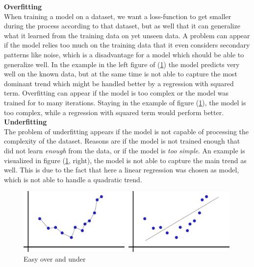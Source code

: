 
\textbf{Overfitting}\\
When training a model on a dataset, we want a loss-function to get smaller during the process according to that dataset, but as well that it can generalize what it learned from the training data on yet unseen data. A problem can appear if the model relies too much on the training data that it even considers secondary patterns like noise, which is a disadvantage for a model which should be able to generalize well. In the example in the left figure of (\ref{fig:underover}) the model predicts very well on the known data, but at the same time is not able to capture the most dominant trend which might be handled better by a regression with squared term. Overfitting can appear if the model is too complex or the model was trained for to many iterations. Staying in the example of figure (\ref{fig:underover}), the model is too complex, while a regression with squared term would perform better. \\

\textbf{Underfitting}\\
The problem of underfitting appears if the model is not capable of processing the complexity of the dataset. Reasons are if the model is not trained enough that did not learn \textit{enough} from the data, or if the model is \textit{too simple}.
An example is visualized in figure (\ref{fig:underover}, right), the model is not able to capture the main trend as well. This is due to the fact that here a linear regression was chosen as model, which is not able to handle a quadratic trend.


\begin{figure}[ht]
    \center
    \includegraphics[width=0.99\textwidth]{figures/underoverfitting.png}
	\caption{Easy over and under}
	\label{fig:underover}
\end{figure}

